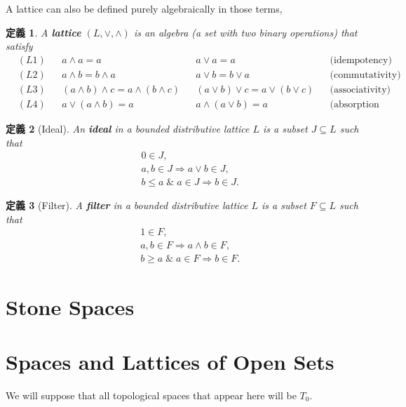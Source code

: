 \documentclass[a4j,12pt]{jarticle}
\numberwithin{equation}{section}
\newcommand{\itbf}[1]{\textit{\textbf{#1}}}
\newtheorem{dfn}{定義}[section]
\begin{document}
A lattice can also be defined purely algebraically in those terms,
\begin{dfn}
  A \itbf{lattice} $(L, \vee, \wedge)$ is an algebra (a set with two binary operations) that satisfy
  \begin{align*}
    \label{eq:lattice-def}
    & (L1) &  & a \wedge a = a && a \vee a = a                       &  & \text{(idempotency)}   \\
    & (L2) &  & a \wedge b = b \wedge a && a \vee b = b\vee a        &  & \text{(commutativity)} \\
    & (L3) &  & (a \wedge b) \wedge c = a \wedge (b \wedge c)       &  & (a \vee b) \vee c = a \vee (b\vee c)                 &  & \text{(associativity)} \\
    & (L4) &  & a \vee (a \wedge b) = a && a \wedge (a \vee  b) =  a &  & \text{(absorption identities)}
  \end{align*}
\end{dfn}
\begin{dfn}[Ideal]
  An \itbf{ideal} in a bounded distributive lattice $L$ is a subset $J \subseteq L$ such that
  \begin{eqnarray}
    \label{eq:ideal}
    && 0 \in J,\\
    && a,b \in J \Rightarrow a \vee b \in J,\\
    && b\le a \;\&\; a \in J \Rightarrow b \in J.
  \end{eqnarray}
\end{dfn}
\begin{dfn}[Filter]
  A \itbf{filter} in a bounded distributive lattice $L$ is a subset $F \subseteq L$ such that
  \begin{eqnarray}
    \label{eq:filter}
    && 1 \in F,\\
    && a,b \in F \Rightarrow a \wedge b \in F,\\
    && b \ge a \;\&\; a \in F \Rightarrow b \in F.
  \end{eqnarray}
\end{dfn}
\section{Stone Spaces}
\section{Spaces and Lattices of Open Sets}
We will suppose that all topological spaces that appear here will be $T_0$.
\end{document}
